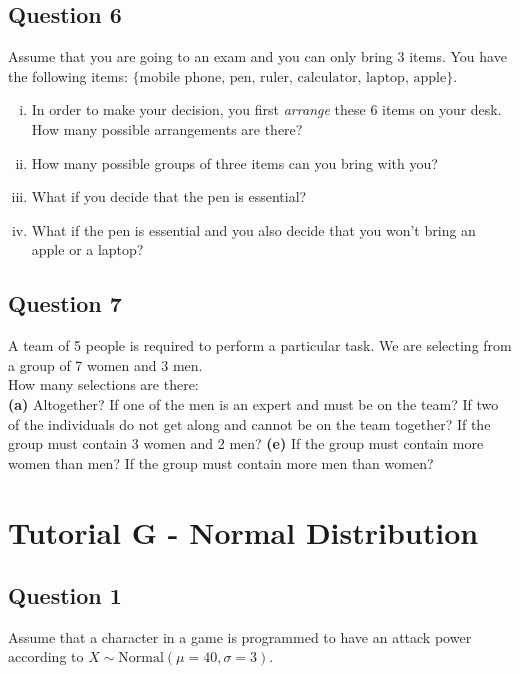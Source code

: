 \documentclass[]{article}
\begin{document}
\subsection*{Question 6}
Assume that you are going to an exam and you can only bring 3 items. You have the following items: $\{\text{mobile phone, } \text{pen, } \text{ruler, } \text{calculator, } \text{laptop, } \text{apple} \}$.\\[-0.2cm]

\begin{enumerate}[(i)]
\item In order to make your decision, you first \emph{arrange} these 6 items on your desk. How many possible arrangements are there? \item How many possible groups of three items can you bring with you? \item What if you decide that the pen is essential? \item What if the pen is essential and you also decide that you won't bring an apple or a laptop?
\end{enumerate}


\subsection*{Question 7}
A team of 5 people is required to perform a particular task. We are selecting from a group of 7 women and 3 men.\\[0.2cm]
How many selections are there:\\[-0.2cm]

{\bf(a)} Altogether?  If one of the men is an expert and must be on the team?  If two of the individuals do not get along and cannot be on the team together?  If the group must contain 3 women and 2 men? {\bf(e)} If the group must contain more women than men?  If the group must contain more men than women?


\section{Tutorial G - Normal Distribution}
\subsection*{Question 1}
Assume that a character in a game is programmed to have an attack power according to $X \sim \text{Normal}(\mu=40,\sigma=3)$.\\[-0.2cm]
\end{document}
